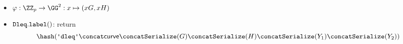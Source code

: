 \documentclass[11pt]{article}
\begin{document}
\begin{itemize}
  \item $\varphi:\ZZ_p\to\GG^2:x\mapsto (xG,xH)$
  \item $\texttt{Dleq}.\texttt{label}()$: return
  \[
    \hash(\dleqlabel \concat \curvectx \concat \serialize(G) \concat \serialize(H) \concat \serialize(\statement_1) \concat \serialize(\statement_2))
  \]
\end{itemize}
\end{document}

